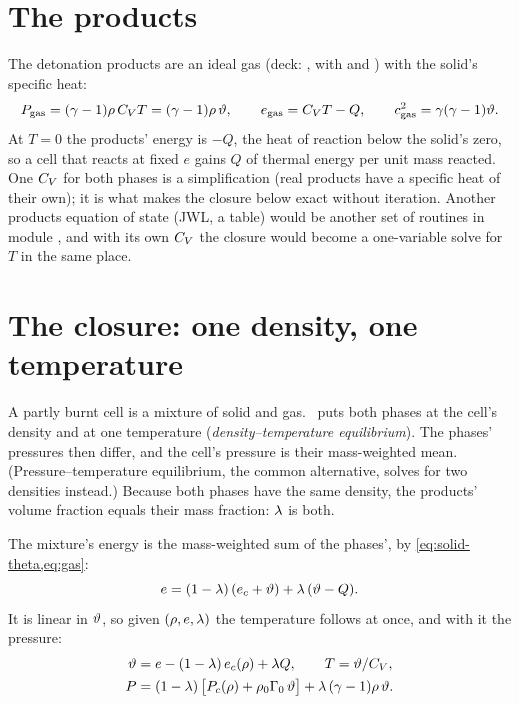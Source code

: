 \section{The products}
\label{sec:products}

The detonation products are an ideal gas (deck: , with  and ) with the solid's specific heat:
\begin{equation}
  P_{\mathrm{gas}} = (\gamma - 1)\rho\,C_{V} T = (\gamma - 1)\rho\,\vartheta, \qquad
  e_{\mathrm{gas}} = C_{V} T - Q, \qquad
  c_{\mathrm{gas}}^2 = \gamma(\gamma - 1)\vartheta.
  \label{eq:gas}
\end{equation}
At $T = 0$ the products' energy is $-Q$, the heat of reaction below the
solid's zero, so a cell that reacts at fixed $e$ gains $Q$ of thermal energy
per unit mass reacted. One $C_{V}$ for both phases is a simplification (real products
have a specific heat of their own); it is what makes the closure below exact
without iteration. Another products equation of state (JWL, a
table) would be another set of routines in module , and with
its own $C_{V}$ the closure would become a one-variable solve for $T$ in the
same place.

\section{The closure: one density, one temperature}
\label{sec:closure}

A partly burnt cell is a mixture of solid and gas. \bw\ puts both phases at
the cell's density and at one temperature (\emph{density--temperature
equilibrium}). The phases' pressures then differ, and the cell's pressure
is their mass-weighted mean. (Pressure--temperature equilibrium, the common
alternative, solves for two densities instead.) Because both phases have
the same density, the products' volume fraction equals their mass fraction:
$\lambda$ is both.

The mixture's energy is the mass-weighted sum of the phases', by
\cref{eq:solid-theta,eq:gas}:
\begin{equation*}
  e = (1 - \lambda)\,(e_c + \vartheta) + \lambda\,(\vartheta - Q).
\end{equation*}
It is linear in $\vartheta$, so given $(\rho, e, \lambda)$ the temperature follows
at once, and with it the pressure:
\begin{align}
  \vartheta &= e - (1 - \lambda)\, e_c(\rho) + \lambda Q, \qquad T = \vartheta/C_{V},
  \label{eq:theta}\\
  P &= (1 - \lambda)\,\bigl[P_{c}(\rho) + \rho_0\Gamma_0\,\vartheta\bigr]
     + \lambda\,(\gamma - 1)\rho\,\vartheta.
  \label{eq:pmix}
\end{align}

